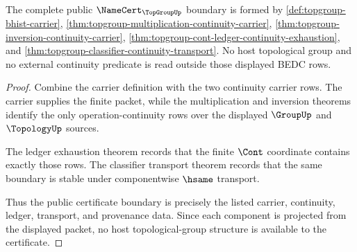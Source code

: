 \begin{theorem}
\label{thm:topgroup-public-certificate-boundary}
The complete public $\NameCert_{\TopGroupUp}$ boundary is formed by
\autoref{def:topgroup-bhist-carrier},
\autoref{thm:topgroup-multiplication-continuity-carrier},
\autoref{thm:topgroup-inversion-continuity-carrier},
\autoref{thm:topgroup-cont-ledger-continuity-exhaustion}, and
\autoref{thm:topgroup-classifier-continuity-transport}. No host
topological group and no external continuity predicate is read outside those
displayed BEDC rows.
\end{theorem}
\begin{proof}
Combine the carrier definition with the two continuity carrier rows. The
carrier supplies the finite packet, while the multiplication and inversion
theorems identify the only operation-continuity rows over the displayed
$\GroupUp$ and $\TopologyUp$ sources.

The ledger exhaustion theorem records that the finite $\Cont$ coordinate
contains exactly those rows. The classifier transport theorem records that
the same boundary is stable under componentwise $\hsame$ transport.

Thus the public certificate boundary is precisely the listed carrier,
continuity, ledger, transport, and provenance data. Since each component is
projected from the displayed packet, no host topological-group structure is
available to the certificate.
\end{proof}

